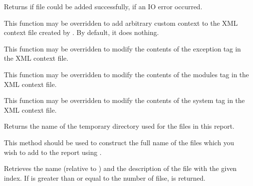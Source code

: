 Returns \true if file could be added successfully, \false if an IO error
occurred.


\label{wxdebugreportdoaddcustomcontext}


This function may be overridden to add arbitrary custom context to the XML
context file created by . By
default, it does nothing.


\label{wxdebugreportdoaddexceptioninfo}


This function may be overridden to modify the contents of the exception tag in
the XML context file.


\label{wxdebugreportdoaddloadedmodules}


This function may be overridden to modify the contents of the modules tag in
the XML context file.


\label{wxdebugreportdoaddsysteminfo}


This function may be overridden to modify the contents of the system tag in
the XML context file.


\label{wxdebugreportgetdirectory}


Returns the name of the temporary directory used for the files in this report.

This method should be used to construct the full name of the files which you
wish to add to the report using .


\label{wxdebugreportgetfile}


Retrieves the name (relative to 
) and the description of the
file with the given index. If  is greater than or equal to the number of
filse, \false is returned.


